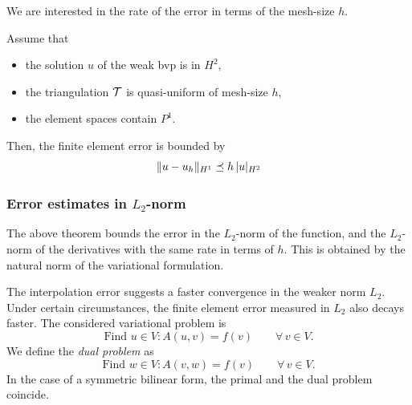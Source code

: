We are interested in the rate of the error in terms of the mesh-size $h$.

\begin{theorem} Assume that
\begin{itemize}
\item the solution $u$ of the weak bvp is in $H^2$,
\item the triangulation ${\cal T}$ is quasi-uniform of mesh-size $h$,
\item the element spaces contain $P^1$.
\end{itemize}
Then, the finite element error is bounded by
$$
\| u - u_h \|_{H^1} \preceq h \, | u |_{H^2}
$$
\end{theorem}


\subsubsection{Error estimates in $L_2$-norm}

The above theorem bounds the error in the $L_2$-norm of the function, and the
$L_2$-norm of the derivatives with the same rate in terms of $h$. This is 
obtained by the natural norm of the variational formulation.

The interpolation error suggests a faster convergence in the weaker norm $L_2$. Under
certain circumstances, the finite element error measured in $L_2$ also decays faster.
The considered variational problem is
$$
\mbox{Find } u \in V : A(u,v) = f(v) \qquad \forall \, v \in V.
$$
We define the {\em dual problem} as
$$
\mbox{Find } w \in V : A(v,w) = f(v) \qquad \forall \, v \in V.
$$
In the case of a symmetric bilinear form, the primal and the dual problem coincide.


